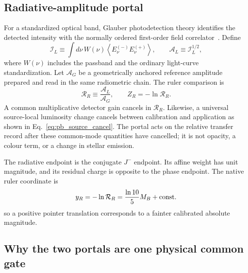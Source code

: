 \documentclass[aps,prd,twocolumn,10pt,superscriptaddress,nofootinbib]{revtex4-2}
\begin{document}
\subsection{Radiative-amplitude portal}
\label{sec:radiative_portal_complete}

For a standardized optical band, Glauber photodetection theory identifies
the detected intensity with the normally ordered first-order field
correlator~\cite{Glauber1963a,Glauber1963b}.  Define
\begin{equation}
 \mathcal I_L\equiv
 \int d\nu\,W(\nu)
 \left\langle E^{(-)}_\nu E^{(+)}_\nu\right\rangle,
 \qquad
 \mathcal A_L\equiv\mathcal I_L^{1/2},
 \label{eq:portal_glauber_amplitude}
\end{equation}
where $W(\nu)$ includes the passband and the ordinary light-curve
standardization.  Let $\mathcal A_G$ be a geometrically anchored reference
amplitude prepared and read in the same radiometric chain.  The ruler
comparison is
\begin{equation}
 \mathcal R_R\equiv\frac{\mathcal A_L}{\mathcal A_G},
 \qquad
 Z_R=-\ln\mathcal R_R.
 \label{eq:portal_radiative_ratio_complete}
\end{equation}
A common multiplicative detector gain cancels in $\mathcal R_R$.  Likewise,
a universal source-local luminosity change cancels between calibration and
application as shown in Eq.~\eqref{eq:pb_source_cancel}.  The portal acts on
the relative transfer record after these common-mode quantities have
cancelled; it is not opacity, a colour term, or a change in stellar
emission.

The radiative endpoint is the conjugate $J^-$ endpoint.  Its affine weight
has unit magnitude, and its residual charge is opposite to the phase
endpoint.  The native ruler coordinate is
\begin{equation}
 y_R=-\ln\mathcal R_R
 =\frac{\ln10}{5}M_B+{\rm const.}
 \label{eq:portal_ruler_native_complete}
\end{equation}
so a positive pointer translation corresponds to a fainter calibrated
absolute magnitude.

\subsection{Why the two portals are one physical common gate}
\label{sec:common_gate_proof_complete}
\end{document}
